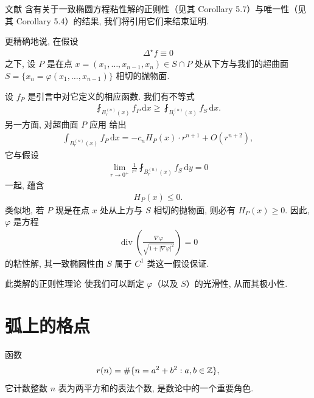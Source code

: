 文献 \cite{b22} 含有关于一致椭圆方程粘性解的正则性（见其 Corollary 5.7）与唯一性（见其 Corollary 5.4）的结果, 我们将引用它们来结束证明.

更精确地说, 在假设
\begin{align*}
  \Delta^{\star}f\equiv 0
\end{align*}
之下, 设 $P$ 是在点 $x = (x_1, \ldots, x_{n-1}, x_n) \in S \cap P$ 处从下方与我们的超曲面 $S = \{x_n = \varphi(x_1, \ldots, x_{n-1})\}$ 相切的抛物面.

设 $f_{P}$ 是引言中对它定义的相应函数. 我们有不等式
\begin{align*}
  \fint_{B_{r}^{(n)}(x)}f_{P}\,\mathrm{d}x\geq\fint_{B_{r}^{(n)}(x)}f_{S}\,\mathrm{d}x.
\end{align*}
另一方面, 对超曲面 $P$ 应用 给出
\begin{align*}
  \int_{B_{r}^{(n)}(x)}f_{P}\,\mathrm{d}x=-c_{n}H_{P}(x)\cdot r^{n+1}+O(r^{n+2}),
\end{align*}
它与假设
\begin{align*}
  \lim_{r\to0^{+}}\frac{1}{r^{2}}\fint_{B_{r}^{(n)}(x)}f_{S}\,\mathrm{d}y=0
\end{align*}
一起, 蕴含
\begin{align*}
  H_{P}(x)\leq 0.
\end{align*}
类似地, 若 $P$ 现是在点 $x$ 处从上方与 $S$ 相切的抛物面, 则必有 $H_P(x) \geq 0$. 因此, $\varphi$ 是方程
\begin{align*}
  \operatorname{div}\left(\frac{\nabla\varphi}{\sqrt{1+|\nabla\varphi|^{2}}}\right)=0
\end{align*}
的粘性解, 其一致椭圆性由 $S$ 属于 $C^{1}$ 类这一假设保证.

此类解的正则性理论 \cite{b34} 使我们可以断定 $\varphi$（以及 $S$）的光滑性, 从而其极小性.

\section{弧上的格点}

函数
\begin{align*}
  r(n)=\#\{n=a^{2}+b^{2}:a,b\in\mathbb{Z}\},
\end{align*}
它计数整数 $n$ 表为两平方和的表法个数, 是数论中的一个重要角色.

